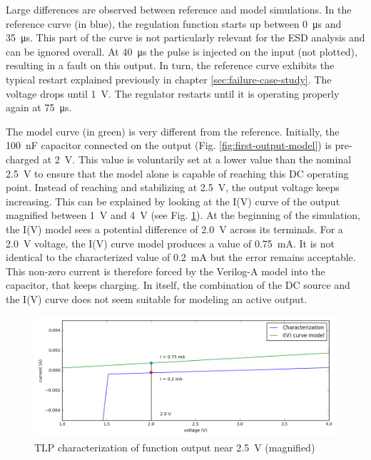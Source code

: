 Large differences are observed between reference and model simulations.
In the reference curve (in blue), the regulation function starts up between \SI{0}{\micro\second} and \SI{35}{\micro\second}.
This part of the curve is not particularly relevant for the ESD analysis and can be ignored overall.
At \SI{40}{\micro\second} the pulse is injected on the input (not plotted), resulting in a fault on this output.
In turn, the reference curve exhibits the typical restart explained previously in chapter \ref{sec:failure-case-study}.
The voltage drops until \SI{1}{\volt}.
The regulator restarts until it is operating properly again at \SI{75}{\micro\second}.

The model curve (in green) is very different from the reference.
Initially, the \SI{100}{\nano\farad} capacitor connected on the output (Fig. \ref{fig:first-output-model}) is pre-charged at \SI{2}{\volt}.
This value is voluntarily set at a lower value than the nominal \SI{2.5}{\volt} to ensure that the model alone is capable of reaching this DC operating point.
Instead of reaching and stabilizing at \SI{2.5}{\volt}, the output voltage keeps increasing.
This can be explained by looking at the I(V) curve of the output magnified between \SI{1}{\volt} and \SI{4}{\volt} (see Fig. \ref{fig:tlp-output-cz-zoomed}).
At the beginning of the simulation, the I(V) model sees a potential difference of \SI{2.0}{\volt} across its terminals.
For a \SI{2.0}{\volt} voltage, the I(V) curve model produces a value of \SI{0.75}{\milli\ampere}.
It is not identical to the characterized value of \SI{0.2}{\milli\ampere} but the error remains acceptable.
This non-zero current is therefore forced by the Verilog-A model into the capacitor, that keeps charging.
In itself, the combination of the DC source and the I(V) curve does not seem suitable for modeling an active output.

\begin{figure}[!h]
  \centering
  \includegraphics[width=\textwidth]{src/4/figures/tlp_output_characterization_magnified.png}
  \caption{TLP characterization of function output near \SI{2.5}{\volt} (magnified)}
  \label{fig:tlp-output-cz-zoomed}
\end{figure}

